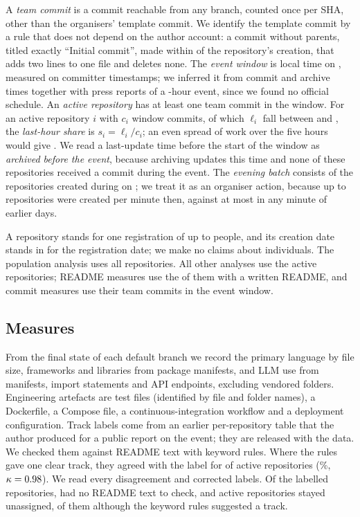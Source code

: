\documentclass{article}
\begin{document}
A \emph{team commit} is a commit reachable from any branch, counted once per SHA, other than the organisers' template commit. We identify the template commit by a rule that does not depend on the author account: a commit without parents, titled exactly ``Initial commit'', made within \templatesecs{} of the repository's creation, that adds two lines to one file and deletes none. The \emph{event window} is \eventwindow{} local time on \eventdate, measured on committer timestamps; we inferred it from commit and archive times together with press reports of a \eventhours-hour event, since we found no official schedule. An \emph{active repository} has at least one team commit in the window. For an active repository $i$ with $c_i$ window commits, of which $\ell_i$ fall between \lasthourstart{} and \deadline{}, the \emph{last-hour share} is $s_i = \ell_i / c_i$; an even spread of work over the five hours would give \evenshare. We read a last-update time before the start of the window as \emph{archived before the event}, because archiving updates this time and none of these repositories received a commit during the event. The \emph{evening batch} consists of the repositories created during \batchwindow{} on \batchday{}; we treat it as an organiser action, because up to \NRqOneBatchMaxPerMinute{} repositories were created per minute then, against at most \NRqOneBatchOrganicMaxPerMinute{} in any minute of earlier days.

A repository stands for one registration of up to \teamsizemax{} people, and its creation date stands in for the registration date; we make no claims about individuals. The population analysis uses all \NRqOneTotal{} repositories. All other analyses use the \NRqOneActiveN{} active repositories; README measures use the \NRqThreeReadmeWritten{} of them with a written README, and commit measures use their team commits in the event window.

\subsection{Measures}
From the final state of each default branch we record the primary language by file size, frameworks and libraries from package manifests, and LLM use from manifests, import statements and API endpoints, excluding vendored folders. Engineering artefacts are test files (identified by file and folder names), a Dockerfile, a Compose file, a continuous-integration workflow and a deployment configuration. Track labels come from an earlier per-repository table that the author produced for a public report on the event; they are released with the data. We checked them against README text with keyword rules. Where the rules gave one clear track, they agreed with the label for \NValidationTracksKwAgree{} of \NValidationTracksKwDecisive{} active repositories (\NValidationTracksKwAgreePct\%, $\kappa = \num{0.98}$). We read every disagreement and corrected \NRqOneLabelFixes{} labels. Of the labelled repositories, \NValidationTracksKwLabelledNoReadmeText{} had no README text to check, and \NRqOneTrackUnclear{} active repositories stayed unassigned, \NValidationTracksKwUnclearWithKw{} of them although the keyword rules suggested a track.
\end{document}
